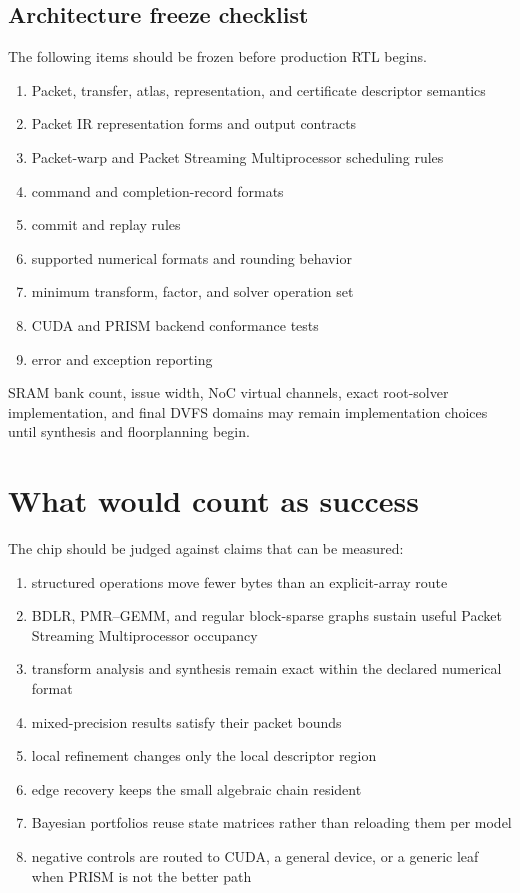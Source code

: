 \documentclass[11pt,oneside,openany]{book}
\theoremstyle{remark}
\begin{document}
\section{Architecture freeze checklist}
The following items should be frozen before production RTL begins.
\begin{enumerate}
\item Packet, transfer, atlas, representation, and certificate descriptor semantics
\item Packet IR representation forms and output contracts
\item Packet-warp and Packet Streaming Multiprocessor scheduling rules
\item command and completion-record formats
\item commit and replay rules
\item supported numerical formats and rounding behavior
\item minimum transform, factor, and solver operation set
\item CUDA and PRISM backend conformance tests
\item error and exception reporting
\end{enumerate}
SRAM bank count, issue width, NoC virtual channels, exact root-solver implementation, and final DVFS domains may remain implementation choices until synthesis and floorplanning begin.

\chapter{What would count as success}

The chip should be judged against claims that can be measured:
\begin{enumerate}
\item structured operations move fewer bytes than an explicit-array route
\item BDLR, PMR--GEMM, and regular block-sparse graphs sustain useful Packet Streaming Multiprocessor occupancy
\item transform analysis and synthesis remain exact within the declared numerical format
\item mixed-precision results satisfy their packet bounds
\item local refinement changes only the local descriptor region
\item edge recovery keeps the small algebraic chain resident
\item Bayesian portfolios reuse state matrices rather than reloading them per model
\item negative controls are routed to CUDA, a general device, or a generic leaf when PRISM is not the better path
\end{enumerate}
\end{document}
